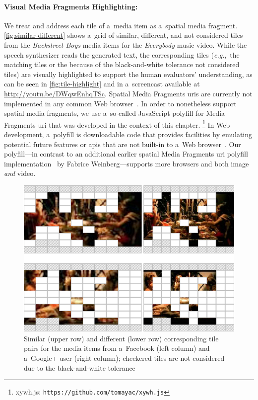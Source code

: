 \paragraph{Visual Media Fragments Highlighting:}

We treat and address each tile of a~media item
as a~spatial media fragment. \autoref{fig:similar-different}
shows a~grid of similar, different, and not considered tiles
from the \emph{Backstreet Boys} media items for the \emph{Everybody} music video.
While the speech synthesizer reads the generated text,
the corresponding tiles (\emph{e.g.},~the matching tiles
or the because of the black-and-white tolerance not considered tiles)
are visually highlighted to support the human evaluators' understanding,
as can be seen in \autoref{fig:tile-highlight}
and in a~screencast available at \url{http://youtu.be/DWqwEnhqTSc}.
Spatial Media Fragments {\sc uri}s are currently not implemented
in any common Web browser~\cite{weinberg2013polyfill}.
In order to nonetheless support spatial media fragments,
we use a~so-called JavaScript polyfill for Media Fragments {\sc uri}
that was developed in the context of this chapter.%
\footnote{xywh.js: \texttt{https://github.com/tomayac/xywh.js}}
In Web development, a~polyfill is downloadable code that provides facilities
by emulating potential future features or {\sc api}s
that are not built-in to a~Web browser~\cite{sharp2010polyfill}.
Our polyfill---in contrast to an additional earlier
spatial Media Fragments {\sc uri} polyfill implementation~\cite{weinberg2013polyfill}
by Fabrice Weinberg---supports more browsers and both image \emph{and} video.

\begin{figure}[!ht]
  \centering
  \includegraphics[width=0.75\linewidth]{./similar-different.png}
  \caption[Similar and different corresponding tile pairs]{Similar (upper row) and different (lower row) corresponding tile pairs for the media items from a~Facebook (left column) and a~Google+ user (right column); checkered tiles are not considered due to the black-and-white tolerance}
  \label{fig:similar-different}
\end{figure}

